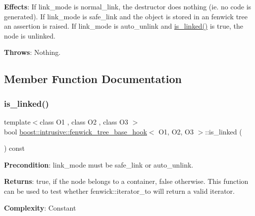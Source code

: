 {\bfseries Effects}\+: If link\+\_\+mode is {\ttfamily normal\+\_\+link}, the destructor does nothing (ie. no code is generated). If link\+\_\+mode is {\ttfamily safe\+\_\+link} and the object is stored in an fenwick tree an assertion is raised. If link\+\_\+mode is {\ttfamily auto\+\_\+unlink} and {\ttfamily \hyperlink{classboost_1_1intrusive_1_1fenwick__tree__base__hook_a87d1e5ed95133ffdc1b2bde6d143545b}{is\+\_\+linked()}} is true, the node is unlinked.

{\bfseries Throws}\+: Nothing. 

\subsection{Member Function Documentation}
\mbox{\label{classboost_1_1intrusive_1_1fenwick__tree__base__hook_a87d1e5ed95133ffdc1b2bde6d143545b}} 
\subsubsection{\texorpdfstring{is\+\_\+linked()}{is\_linked()}}
{\footnotesize\ttfamily template$<$class O1 , class O2 , class O3 $>$ \\
bool \hyperlink{classboost_1_1intrusive_1_1fenwick__tree__base__hook}{boost\+::intrusive\+::fenwick\+\_\+tree\+\_\+base\+\_\+hook}$<$ O1, O2, O3 $>$\+::is\+\_\+linked (\begin{DoxyParamCaption}{ }\end{DoxyParamCaption}) const}

{\bfseries Precondition}\+: link\+\_\+mode must be {\ttfamily safe\+\_\+link} or {\ttfamily auto\+\_\+unlink}.

{\bfseries Returns}\+: true, if the node belongs to a container, false otherwise. This function can be used to test whether {\ttfamily fenwick\+::iterator\+\_\+to} will return a valid iterator.

{\bfseries Complexity}\+: Constant \mbox{\label{classboost_1_1intrusive_1_1fenwick__tree__base__hook_a57b63d8ace2bc5a3c6a74c580ffb859d}} 
